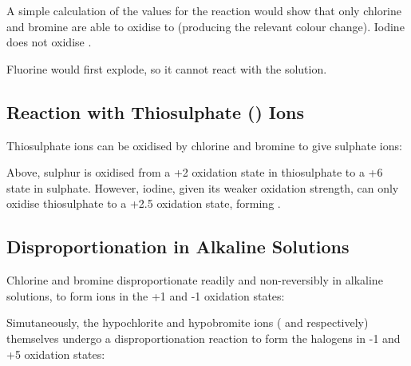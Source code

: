 			A simple calculation of the \Ecell{} values for the reaction would show that only chlorine and bromine are able to oxidise
			 to  (producing the relevant colour change). Iodine does not oxidise .

			Fluorine would first explode, so it cannot react with the  solution.





		\subsection{Reaction with Thiosulphate (\texorpdfstring{}{S₂O₃²⁻}) Ions}

			Thiosulphate ions can be oxidised by chlorine and bromine to give sulphate ions:


			Above, sulphur is oxidised from a +2 oxidation state in thiosulphate to a +6 state in sulphate. However, iodine, given its weaker
			oxidation strength, can only oxidise thiosulphate to a +2.5 oxidation state, forming .





		\subsection{Disproportionation in Alkaline Solutions}

			Chlorine and bromine disproportionate readily and non-reversibly in alkaline solutions, to form ions in the +1 and
			-1 oxidation states:


			Simutaneously, the hypochlorite and hypobromite ions ( and  respectively) themselves undergo a
			disproportionation reaction to form the halogens in -1 and +5 oxidation states:

